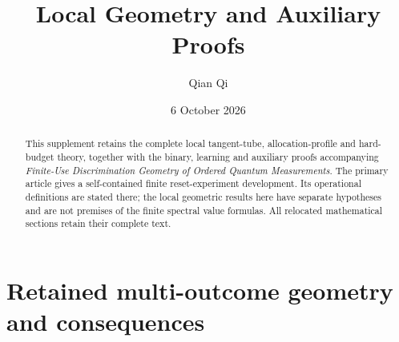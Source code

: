 \documentclass[11pt]{amsart}
\title[Local geometry and auxiliary proofs]{Local Geometry and Auxiliary Proofs}
\author{Qian Qi}
\date{6 October 2026}
\numberwithin{equation}{section}
\theoremstyle{definition}\newtheorem{definition}[theorem]{Definition}
\theoremstyle{remark}\newtheorem{remark}[theorem]{Remark}
\begin{document}
\raggedbottom
\begin{abstract}
This supplement retains the complete local tangent-tube, allocation-profile
and hard-budget theory, together with the binary, learning and auxiliary
proofs accompanying \emph{Finite-Use Discrimination Geometry of Ordered
Quantum Measurements}.  The primary article gives a self-contained finite
reset-experiment development.  Its operational definitions are stated
there; the local geometric results here have separate hypotheses and are
not premises of the finite spectral value formulas.  All relocated
mathematical sections retain their complete text.
\end{abstract}
\maketitle


































\section{Retained multi-outcome geometry and consequences}





\end{document}
